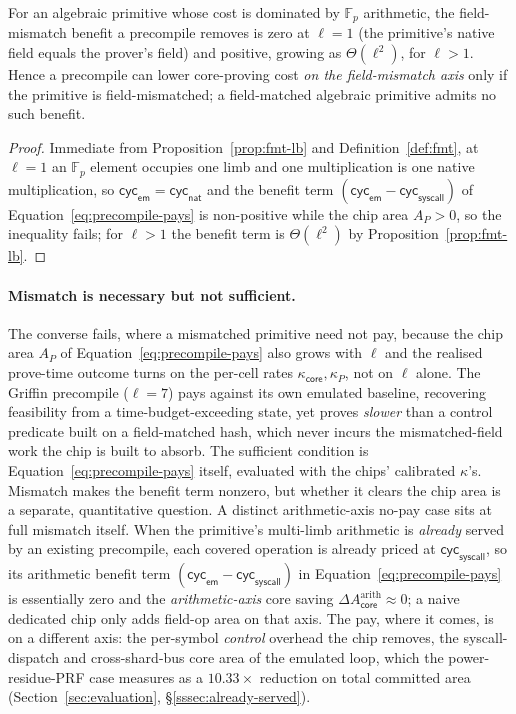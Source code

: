 \begin{proposition}\label{prop:field-match}
For an algebraic primitive whose cost is dominated by $\mathbb{F}_p$ arithmetic, the field-mismatch benefit a precompile removes is zero at $\ell=1$ (the primitive's native field equals the prover's field) and positive, growing as $\Theta(\ell^2)$, for $\ell>1$. Hence a precompile can lower core-proving cost \emph{on the field-mismatch axis} only if the primitive is field-mismatched; a field-matched algebraic primitive admits no such benefit.
\end{proposition}

\begin{proof} 
Immediate from Proposition~\ref{prop:fmt-lb} and Definition~\ref{def:fmt}, at $\ell=1$ an $\mathbb{F}_p$ element occupies one limb and one multiplication is one native multiplication, so $\mathsf{cyc}_{\mathsf{em}}=\mathsf{cyc}_{\mathsf{nat}}$ and the benefit term $(\mathsf{cyc}_{\mathsf{em}}-\mathsf{cyc}_{\mathsf{syscall}})$ of Equation~\eqref{eq:precompile-pays} is non-positive while the chip area $A_P>0$, so the inequality fails; for $\ell>1$ the benefit term is $\Theta(\ell^2)$ by Proposition~\ref{prop:fmt-lb}.
\end{proof}

\paragraph{Mismatch is necessary but not sufficient.} The converse fails, where a mismatched primitive need not pay, because the chip area $A_P$ of Equation~\eqref{eq:precompile-pays} also grows with $\ell$ and the realised prove-time outcome turns on the per-cell rates $\kappa_{\mathsf{core}},\kappa_P$, not on $\ell$ alone. The Griffin precompile ($\ell=7$) pays against its own emulated baseline, recovering feasibility from a time-budget-exceeding state, yet proves \emph{slower} than a control predicate built on a field-matched hash, which never incurs the mismatched-field work the chip is built to absorb. The sufficient condition is Equation~\eqref{eq:precompile-pays} itself, evaluated with the chips' calibrated $\kappa$'s. Mismatch makes the benefit term nonzero, but whether it clears the chip area is a separate, quantitative question. A distinct arithmetic-axis no-pay case sits at full mismatch itself. When the primitive's multi-limb arithmetic is \emph{already} served by an existing precompile, each covered operation is already priced at $\mathsf{cyc}_{\mathsf{syscall}}$, so its arithmetic benefit term $(\mathsf{cyc}_{\mathsf{em}}-\mathsf{cyc}_{\mathsf{syscall}})$ in Equation~\eqref{eq:precompile-pays} is essentially zero and the \emph{arithmetic-axis} core saving $\Delta A_{\mathsf{core}}^{\mathrm{arith}}\approx 0$; a naive dedicated chip only adds field-op area on that axis. The pay, where it comes, is on a different axis: the per-symbol \emph{control} overhead the chip removes, the syscall-dispatch and cross-shard-bus core area of the emulated loop, which the power-residue-PRF case measures as a $10.33\times$ reduction on total committed area (Section~\ref{sec:evaluation}, \S\ref{sssec:already-served}).

